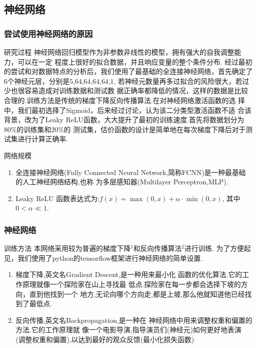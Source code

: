 \documentclass[10pt]{beamer}
\begin{document}
\subsection{神经网络}

\begin{frame}
	\frametitle{尝试使用神经网络的原因}
	\begin{block}{研究过程}
		神经网络回归模型作为非参数非线性的模型，拥有强大的自我调整能力，可以在一定
		程度上很好的拟合数据，并且响应变量的整个条件分布.
		经过最初的尝试和对数据特点的分析后，我们使用了最基础的全连接神经网络，首先确定了$6$个神经元层，分别是$5$,$64$,$64$,$64$,$64$,$1$,
		若神经元数量再多过拟合的风险很大，若过少也很容易造成对训练数据和测试数
		据正确率都降低的情况，这样的数据是比较合理的.训练方法是传统的梯度下降反向传播算法.在对神经网络激活函数的选
		择中，我们最初选择了Sigmoid，后来经过讨论，认为该二分类型激活函数不适
		合该背景，改为了Leaky ReLU函数，大大提升了最初的训练速度.首先将数据划分为$80\%$的训练集和$20\%$的
		测试集，估价函数的设计是简单地在每次梯度下降后对于测试集进行计算正确率.
	\end{block}
	\begin{block}{网络规模}
		\begin{enumerate}
			\item 全连接神经网络(Fully Connected Neural Network,简称FCNN)是一种最基础的人工神经网络结构,也称
			      为多层感知器(Multilayer Perceptron,MLP).
			\item Leaky ReLU 函数表达式为:\qquad$f(x)=\max(0, x) + \alpha \cdot \min(0, x)$, 其中$0 < \alpha \ll 1$.
		\end{enumerate}
	\end{block}
\end{frame}

\begin{frame}
	\frametitle{神经网络}

	\begin{block}{训练方法}
		本网络采用较为普遍的梯度下降$^1$和反向传播算法$^2$进行训练.
		为了方便起见，我们使用了python的tensorflow框架进行神经网络的简单设置.
		\begin{enumerate}
			\item 梯度下降,英文名Gradient Descent,是一种用来最小化
			      函数的优化算法.它的工作原理就像一个探险家在山上寻找最
			      低点.探险家在每一步都会选择下坡的方向，直到他找到一个
			      地方,无论向哪个方向走,都是上坡,那么他就知道他已经找到了最低点.
			\item 反向传播,英文名Backpropagation,是一种在
			      神经网络中用来调整权重和偏置的方法.它的工作原理就
			      像一个电影导演,指导演员们(神经元)如何更好地表演
			      (调整权重和偏置),以达到最好的观众反馈(最小化损失函数)
		\end{enumerate}
	\end{block}
\end{frame}
\end{document}
